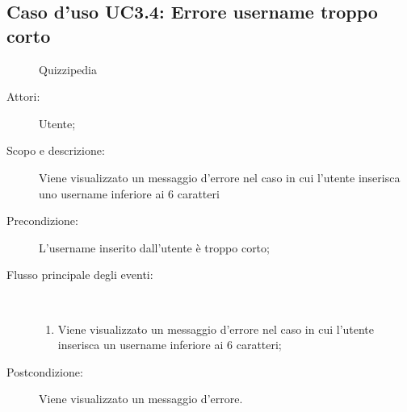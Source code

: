 \subsection{Caso d'uso UC3.4: Errore username troppo corto}
	\begin{figure}[H]
		\centering
		\begin{resizedtikzpicture}{\textwidth}
		\begin{umlsystem}[x=0, fill=lightgray!20]{Quizzipedia}
		\end{umlsystem}
		\end{resizedtikzpicture}
		\caption{}
	\end{figure}
\begin{description}
\item[Attori:] Utente;
\item[Scopo e descrizione:] Viene visualizzato un messaggio d'errore nel caso in cui l'utente inserisca uno username inferiore ai 6 caratteri
      \item[Precondizione:] L'username inserito dall'utente è troppo corto;

        \item[Flusso principale degli eventi:] \ 
 \begin{enumerate}
          \item Viene visualizzato un messaggio d'errore nel caso in cui l'utente inserisca un username inferiore ai 6 caratteri;

      \end{enumerate}
    \item[Postcondizione:] Viene visualizzato un messaggio d'errore.
  \end{description}
\hypertarget{UC3.5}{}
